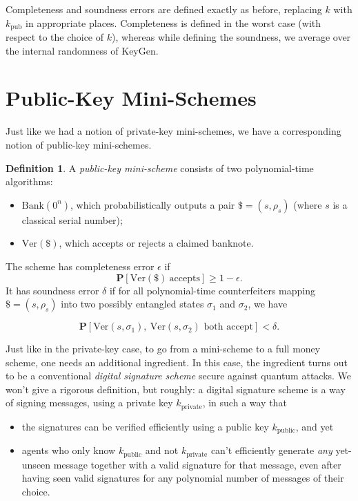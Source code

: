 \documentclass[11pt]{report}
\theoremstyle{plain}
\theoremstyle{definition}
\newtheorem{definition}[theorem]{Definition}
\renewcommand{\Pr}{\mathbf{P}}
\begin{document}
Completeness and soundness errors are defined exactly as before, replacing $k$ with $k_{\text{pub}}$ in appropriate places.  Completeness is defined in the worst case (with respect to the choice of $k$), whereas while defining the soundness, we average over the internal randomness of KeyGen.

\section{Public-Key Mini-Schemes}

Just like we had a notion of private-key mini-schemes, we have a corresponding notion of public-key mini-schemes.

\begin{definition} \label{def:public_mini}
A {\em public-key mini-scheme} consists of two polynomial-time algorithms:
\begin{itemize}
\item $\text{Bank}(0^n)$, which probabilistically outputs a pair $\$ = (s, \rho_s)$ (where $s$ is a classical serial number);
\item $\text{Ver}(\$)$, which accepts or rejects a claimed banknote.
\end{itemize}
\end{definition}
The scheme has completeness error $\epsilon$ if
$$
\Pr[\text{Ver}(\$)\ \text{accepts}] \geq 1-\epsilon.
$$
It has soundness error $\delta$ if for all polynomial-time counterfeiters mapping $\$ = (s,\rho_s)$ into two possibly entangled states $\sigma_1$ and $\sigma_2$, we have

$$\Pr[\text{Ver}(s,\sigma_1),\ \text{Ver}(s,\sigma_2)\text{ both accept}] < \delta.$$

Just like in the private-key case, to go from a mini-scheme to a full money scheme, one needs an additional ingredient.  In this case, the ingredient turns out to be a conventional {\em digital signature scheme} secure against quantum attacks.  We won't give a rigorous definition, but roughly: a digital signature scheme is a way of signing messages, using a private key $k_{\text{private}}$, in such a way that
\begin{itemize}
\item the signatures can be verified efficiently using a public key $k_{\text{public}}$, and yet
\item agents who only know $k_{\text{public}}$ and not $k_{\text{private}}$ can't efficiently generate {\em any} yet-unseen message together with a valid signature for that message, even after having seen valid signatures for any polynomial number of messages of their choice.
\end{itemize}
\end{document}
